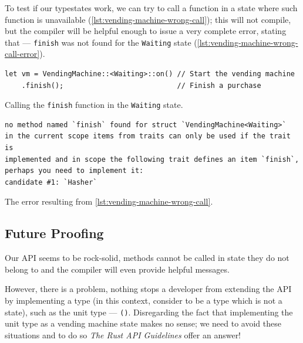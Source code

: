 To test if our typestates work, we can try to call a function in a state where such function is unavailable (\autoref{lst:vending-machine-wrong-call});
this will not compile, but the compiler will be helpful enough to issue a very complete error, stating that ---
\texttt{finish} was not found for the \texttt{Waiting} state (\autoref{lst:vending-machine-wrong-call-error}).

\begin{listing}
    \begin{verbatim}
let vm = VendingMachine::<Waiting>::on() // Start the vending machine
    .finish();                           // Finish a purchase
\end{verbatim}
    \caption{Calling the \texttt{finish} function in the \texttt{Waiting} state.}
    \label{lst:vending-machine-wrong-call}
\end{listing}

\begin{listing}
    \begin{verbatim}
no method named `finish` found for struct `VendingMachine<Waiting>`
in the current scope items from traits can only be used if the trait is
implemented and in scope the following trait defines an item `finish`,
perhaps you need to implement it:
candidate #1: `Hasher`
\end{verbatim}
    \caption{The error resulting from \autoref{lst:vending-machine-wrong-call}.}
    \label{lst:vending-machine-wrong-call-error}
\end{listing}

\subsection{Future Proofing}\label{sec:typestates-hard-way:future}

Our \gls{API} seems to be rock-solid,
methods cannot be called in state they do not belong to and the compiler will even provide helpful messages.

However, there is a problem, nothing stops a developer from extending the \gls{API} by implementing a  type
(in this context, consider  to be a type which is not a state), such as the unit type --- \texttt{()}.
Disregarding the fact that implementing the unit type as a vending machine state makes no sense;
we need to avoid these situations and to do so \emph{The Rust API Guidelines} offer an answer! %

